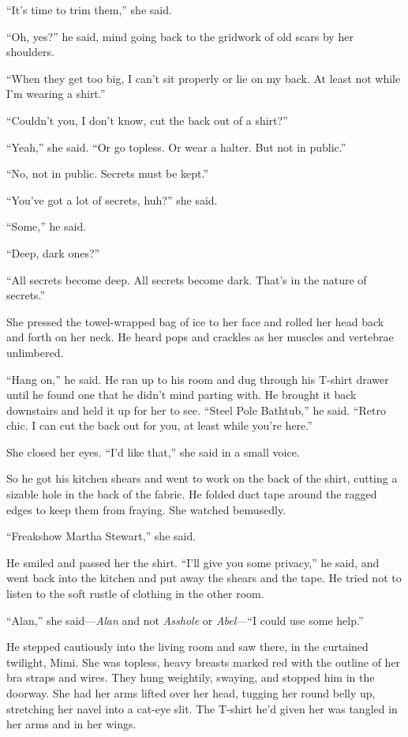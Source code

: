 ``It's time to trim them,'' she said.

``Oh, yes?'' he said, mind going back to the gridwork of old scars by
her shoulders.

``When they get too big, I can't sit properly or lie on my back.  At
least not while I'm wearing a shirt.''

``Couldn't you, I don't know, cut the back out of a shirt?''

``Yeah,'' she said.  ``Or go topless.  Or wear a halter.  But not in
public.''

``No, not in public.  Secrets must be kept.''

``You've got a lot of secrets, huh?'' she said.

``Some,'' he said.

``Deep, dark ones?''

``All secrets become deep.  All secrets become dark.  That's in the
nature of secrets.''

She pressed the towel-wrapped bag of ice to her face and rolled her
head back and forth on her neck.  He heard pops and crackles as her
muscles and vertebrae unlimbered.

``Hang on,'' he said.  He ran up to his room and dug through his
T-shirt drawer until he found one that he didn't mind parting with. 
He brought it back downstairs and held it up for her to see.  ``Steel
Pole Bathtub,'' he said.  ``Retro chic.  I can cut the back out for
you, at least while you're here.''

She closed her eyes.  ``I'd like that,'' she said in a small voice.

So he got his kitchen shears and went to work on the back of the
shirt, cutting a sizable hole in the back of the fabric.  He folded
duct tape around the ragged edges to keep them from fraying.  She
watched bemusedly.

``Freakshow Martha Stewart,'' she said.

He smiled and passed her the shirt.  ``I'll give you some privacy,''
he said, and went back into the kitchen and put away the shears and
the tape.  He tried not to listen to the soft rustle of clothing in
the other room.

``Alan,'' she said---\textit{Alan} and not \textit{Asshole} or
\textit{Abel}---``I could use some help.''

He stepped cautiously into the living room and saw there, in the
curtained twilight, Mimi.  She was topless, heavy breasts marked red
with the outline of her bra straps and wires.  They hung weightily,
swaying, and stopped him in the doorway.  She had her arms lifted over
her head, tugging her round belly up, stretching her navel into a
cat-eye slit.  The T-shirt he'd given her was tangled in her arms and
in her wings.

